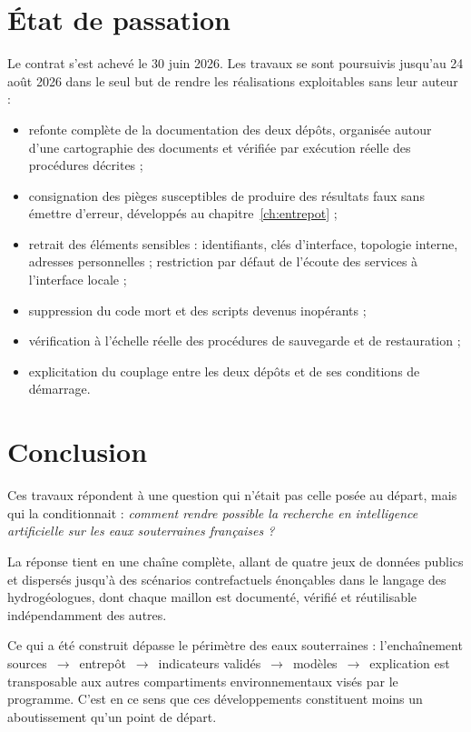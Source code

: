 \section{État de passation}

Le contrat s'est achevé le 30 juin 2026. Les travaux se sont poursuivis jusqu'au 24 août 2026
dans le seul but de rendre les réalisations exploitables sans leur auteur :

\begin{itemize}
  \item refonte complète de la documentation des deux dépôts, organisée autour d'une
  cartographie des documents et vérifiée par exécution réelle des procédures décrites ;
  \item consignation des pièges susceptibles de produire des résultats faux sans émettre
  d'erreur, développés au chapitre~\ref{ch:entrepot} ;
  \item retrait des éléments sensibles : identifiants, clés d'interface, topologie interne,
  adresses personnelles ; restriction par défaut de l'écoute des services à l'interface locale ;
  \item suppression du code mort et des scripts devenus inopérants ;
  \item vérification à l'échelle réelle des procédures de sauvegarde et de restauration ;
  \item explicitation du couplage entre les deux dépôts et de ses conditions de démarrage.
\end{itemize}

\section{Conclusion}

Ces travaux répondent à une question qui n'était pas celle posée au départ, mais qui la
conditionnait : \emph{comment rendre possible la recherche en intelligence artificielle sur les
eaux souterraines françaises ?}

La réponse tient en une chaîne complète, allant de quatre jeux de données publics et dispersés
jusqu'à des scénarios contrefactuels énonçables dans le langage des hydrogéologues, dont chaque
maillon est documenté, vérifié et réutilisable indépendamment des autres.

Ce qui a été construit dépasse le périmètre des eaux souterraines : l'enchaînement
sources~$\rightarrow$~entrepôt~$\rightarrow$~indicateurs validés~$\rightarrow$~modèles~$\rightarrow$~explication
est transposable aux autres compartiments environnementaux visés par le programme. C'est en ce
sens que ces développements constituent moins un aboutissement qu'un point de départ.

